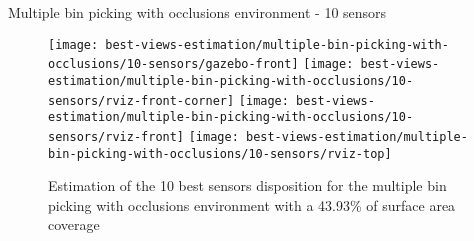 Multiple bin picking with occlusions environment - 10 sensors

\begin{figure}
	\centering
	\texttt{[image: best-views-estimation/multiple-bin-picking-with-occlusions/10-sensors/gazebo-front]}\vspace{2em}
	\texttt{[image: best-views-estimation/multiple-bin-picking-with-occlusions/10-sensors/rviz-front-corner]}\vspace{2em}
	\texttt{[image: best-views-estimation/multiple-bin-picking-with-occlusions/10-sensors/rviz-front]}\vspace{2em}
	\texttt{[image: best-views-estimation/multiple-bin-picking-with-occlusions/10-sensors/rviz-top]}
	\caption{Estimation of the 10 best sensors disposition for the multiple bin picking with occlusions environment with a 43.93\% of surface area coverage}
\end{figure}

